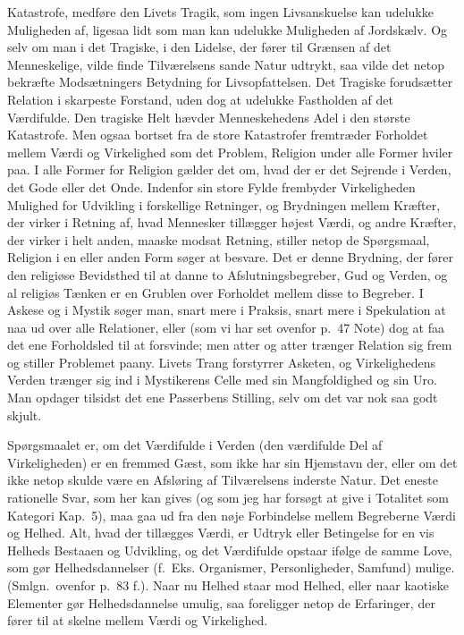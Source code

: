 \documentclass[12pt]{article}
\newcommand{\opage}[1]{\marginnote{\footnotesize\textit{[#1]}}}
\begin{document}
Katastrofe, medføre den Livets Tragik, som ingen Livsanskuelse kan
udelukke Muligheden af, ligesaa lidt som man kan udelukke Muligheden
af Jordskælv. Og selv om man i det Tragiske, i den Lidelse, der fører
til Grænsen af det Menneskelige, vilde finde Tilværelsens sande Natur
udtrykt, saa vilde det netop bekræfte Modsætningers Betydning for
Livsopfattelsen. Det Tragiske forudsætter Relation i skarpeste
Forstand, uden dog at udelukke Fastholden af det Værdifulde. Den
tragiske Helt hævder Menneskehedens Adel i den største Katastrofe. Men
ogsaa bortset fra de store Katastrofer fremtræder Forholdet mellem
Værdi og Virkelighed som det Problem, Religion under alle Former
hviler paa. I alle Former for Religion gælder det om, hvad der er det
Sejrende i Verden, det Gode eller det Onde. Indenfor sin store Fylde
frembyder Virkeligheden Mulighed for Udvikling i forskellige
Retninger, og Brydningen mellem Kræfter, der virker i Retning af, hvad
Mennesker tillægger højest Værdi, og andre Kræfter, der virker i helt
anden, maaske modsat Retning, stiller netop de Spørgsmaal, Religion i
en eller anden Form søger at besvare. Det er denne Brydning, der fører
den religiøse Bevidsthed til at danne to Afslutningsbegreber, Gud og
Verden, og al religiøs Tænken er en Grublen over Forholdet mellem
disse to Begreber. I Askese og i Mystik søger man, snart mere i
Praksis, snart mere i Spekulation at naa ud over alle Relationer,
eller (som vi har set ovenfor p.~47 Note) dog at faa det ene
Forholdsled til at forsvinde; men atter og atter trænger Relation sig
frem og stiller Problemet paany. Livets Trang forstyrrer Asketen,
\opage{96} og Virkelighedens Verden trænger sig ind i Mystikerens Celle med sin
Mangfoldighed og sin Uro. Man opdager tilsidst det ene Passerbens
Stilling, selv om det var nok saa godt skjult.

Spørgsmaalet er, om det Værdifulde i Verden (den værdifulde Del af
Virkeligheden) er en fremmed Gæst, som ikke har sin Hjemstavn der,
eller om det ikke netop skulde være en Afsløring af Tilværelsens
inderste Natur. Det eneste rationelle Svar, som her kan gives (og som
jeg har forsøgt at give i \guillemotright Totalitet som
Kategori\guillemotleft{} Kap.~5), maa gaa ud fra den nøje Forbindelse
mellem Begreberne Værdi og Helhed. Alt, hvad der tillægges Værdi, er
Udtryk eller Betingelse for en vis Helheds Bestaaen og Udvikling, og
det Værdifulde opstaar ifølge de samme Love, som gør Helhedsdannelser
(f.\ Eks. Organismer, Personligheder, Samfund) mulige.
(Smlgn.\ ovenfor p.~83 f.). Naar nu Helhed staar mod Helhed, eller naar
kaotiske Elementer gør Helhedsdannelse umulig, saa foreligger netop de
Erfaringer, der fører til at skelne mellem Værdi og Virkelighed.
\end{document}
